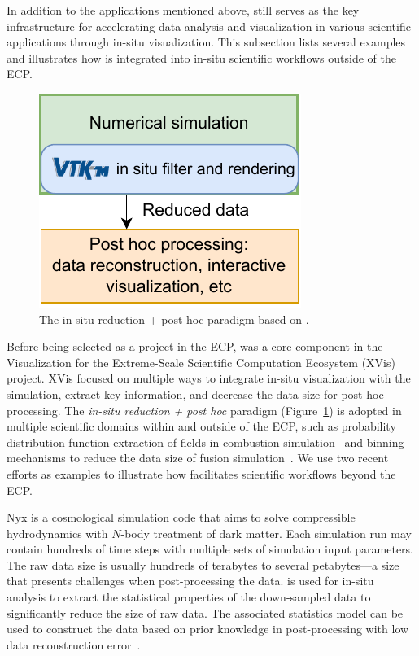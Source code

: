 
In addition to the applications mentioned above, \vtkm still serves as the key infrastructure for accelerating data analysis and visualization in various scientific applications through in-situ visualization. This subsection lists several examples and illustrates how \vtkm is integrated into in-situ scientific workflows outside of the ECP.


\begin{figure}[htb]
  \centering
\includegraphics[width=0.60\linewidth]{figures/vtkm_insitu_posthoc}
\caption{The in-situ reduction + post-hoc paradigm based on \vtkm.}
\label{fig:vtkm_insitu_posthoc}
\end{figure}

Before being selected as a project in the ECP, \vtkm was a core component in the Visualization for the Extreme-Scale Scientific Computation Ecosystem (XVis)~\citep{Moreland2019} project. 
XVis focused on multiple ways to integrate in-situ visualization with the simulation, extract key information, and decrease the data size for post-hoc processing.
The \textit{in-situ reduction + post hoc} paradigm (Figure~\ref{fig:vtkm_insitu_posthoc}) is adopted in multiple scientific domains within and outside of the ECP, such as probability distribution function extraction of fields in combustion simulation~\citep{Ye2016} and binning mechanisms to reduce the data size of fusion simulation~\citep{Kress2018}. We use two recent efforts as examples to illustrate how \vtkm facilitates scientific workflows beyond the ECP.


Nyx is a cosmological simulation code that aims to solve compressible hydrodynamics with $N$-body treatment of dark matter. Each simulation run may contain hundreds of time steps with multiple sets of simulation input parameters. The raw data size is usually hundreds of terabytes to several petabytes---a size that presents challenges when post-processing the data. 
\vtkm is used for in-situ analysis to extract the statistical properties of the down-sampled data to significantly reduce the size of raw data. The associated statistics model can be used to construct the data based on prior knowledge in post-processing with low data reconstruction error~\citep{Wang2019}.

